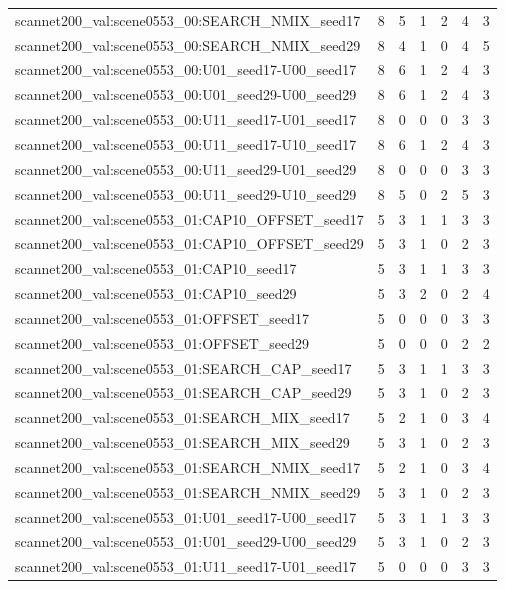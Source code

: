 \begin{table}[t]
\begin{tabular}{lrrrrrr}
scannet200\_val:scene0553\_00:SEARCH\_NMIX\_seed17 & 8 & 5 & 1 & 2 & 4 & 3 \\
scannet200\_val:scene0553\_00:SEARCH\_NMIX\_seed29 & 8 & 4 & 1 & 0 & 4 & 5 \\
scannet200\_val:scene0553\_00:U01\_seed17-U00\_seed17 & 8 & 6 & 1 & 2 & 4 & 3 \\
scannet200\_val:scene0553\_00:U01\_seed29-U00\_seed29 & 8 & 6 & 1 & 2 & 4 & 3 \\
scannet200\_val:scene0553\_00:U11\_seed17-U01\_seed17 & 8 & 0 & 0 & 0 & 3 & 3 \\
scannet200\_val:scene0553\_00:U11\_seed17-U10\_seed17 & 8 & 6 & 1 & 2 & 4 & 3 \\
scannet200\_val:scene0553\_00:U11\_seed29-U01\_seed29 & 8 & 0 & 0 & 0 & 3 & 3 \\
scannet200\_val:scene0553\_00:U11\_seed29-U10\_seed29 & 8 & 5 & 0 & 2 & 5 & 3 \\
scannet200\_val:scene0553\_01:CAP10\_OFFSET\_seed17 & 5 & 3 & 1 & 1 & 3 & 3 \\
scannet200\_val:scene0553\_01:CAP10\_OFFSET\_seed29 & 5 & 3 & 1 & 0 & 2 & 3 \\
scannet200\_val:scene0553\_01:CAP10\_seed17 & 5 & 3 & 1 & 1 & 3 & 3 \\
scannet200\_val:scene0553\_01:CAP10\_seed29 & 5 & 3 & 2 & 0 & 2 & 4 \\
scannet200\_val:scene0553\_01:OFFSET\_seed17 & 5 & 0 & 0 & 0 & 3 & 3 \\
scannet200\_val:scene0553\_01:OFFSET\_seed29 & 5 & 0 & 0 & 0 & 2 & 2 \\
scannet200\_val:scene0553\_01:SEARCH\_CAP\_seed17 & 5 & 3 & 1 & 1 & 3 & 3 \\
scannet200\_val:scene0553\_01:SEARCH\_CAP\_seed29 & 5 & 3 & 1 & 0 & 2 & 3 \\
scannet200\_val:scene0553\_01:SEARCH\_MIX\_seed17 & 5 & 2 & 1 & 0 & 3 & 4 \\
scannet200\_val:scene0553\_01:SEARCH\_MIX\_seed29 & 5 & 3 & 1 & 0 & 2 & 3 \\
scannet200\_val:scene0553\_01:SEARCH\_NMIX\_seed17 & 5 & 2 & 1 & 0 & 3 & 4 \\
scannet200\_val:scene0553\_01:SEARCH\_NMIX\_seed29 & 5 & 3 & 1 & 0 & 2 & 3 \\
scannet200\_val:scene0553\_01:U01\_seed17-U00\_seed17 & 5 & 3 & 1 & 1 & 3 & 3 \\
scannet200\_val:scene0553\_01:U01\_seed29-U00\_seed29 & 5 & 3 & 1 & 0 & 2 & 3 \\
scannet200\_val:scene0553\_01:U11\_seed17-U01\_seed17 & 5 & 0 & 0 & 0 & 3 & 3 \\

\end{tabular}
\end{table}
